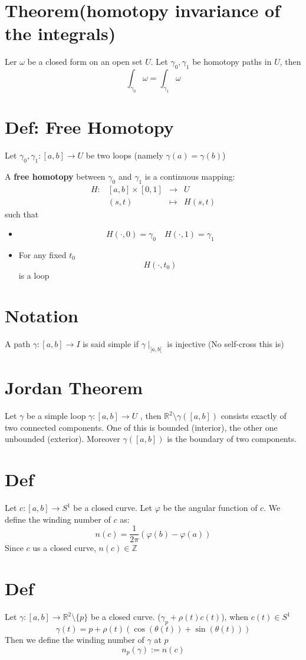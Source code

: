 \documentclass{book}
\newcommand{\leftbracket}{[}
\newcommand{\rightbracket}{]}
\begin{document}
\section{Theorem(homotopy invariance of the integrals)}
Ler $\omega$ be a closed form on an open set $U$. Let $\gamma_0,\gamma_1$ be homotopy paths in $U$, then $$\int_{\gamma_0}\omega=\int_{\gamma_1}\omega$$
\section{Def: Free Homotopy}
Let $\gamma_0,\gamma_1:[a,b]\rightarrow U$ be two loops (namely $\gamma(a)=\gamma(b)$)

A \textbf{free homotopy} between $\gamma_0$ and $\gamma_1$ is a continuous mapping:
$$\begin{aligned}
    H:&[a,b]\times[0,1]&\rightarrow&U\\
    &(s,t)&\mapsto&H(s,t)
\end{aligned}$$
such that\begin{itemize}
    \item $$H(\cdot,0)=\gamma_0\quad H(\cdot,1)=\gamma_1$$
    \item For any fixed $t_0$$$H(\cdot,t_0)$$ is a loop
\end{itemize}
\section{Notation}
A path $\gamma:[a,b]\rightarrow I$ is said simple if $\gamma\mid_{\rightbracket a,b\leftbracket}$ is injective (No self-cross this is)
\section{Jordan Theorem}
Let $\gamma$ be a simple loop $\gamma:[a,b]\rightarrow U$ , then $\mathbb{R}^2\setminus\gamma([a,b])$ consists exactly of two connected components. One of this is bounded (interior), the other one unbounded (exterior). Moreover $\gamma([a,b])$ is the boundary of two components.
\section{Def}
Let $c:[a,b]\rightarrow S^1$ be a closed curve. Let $\varphi$ be the angular function of $c$. We define the winding number of $c$ as:
$$n(c)=\frac{1}{2\pi}(\varphi(b)-\varphi(a))$$
Since $c$ us a closed curve, $n(c)\in \mathbb{Z}$
\section{Def}
Let $\gamma:[a,b]\rightarrow\mathbb{R}^2\setminus\{p\}$ be a closed curve. ($\gamma_p+\rho(t)c(t)$), when $c(t)\in S^1$$$\gamma(t)=p+\rho(t)(\cos(\theta(t))+\sin(\theta(t)))$$
Then we define the winding number of $\gamma$ at $p$
$$n_p(\gamma):=n(c)$$
\end{document}
